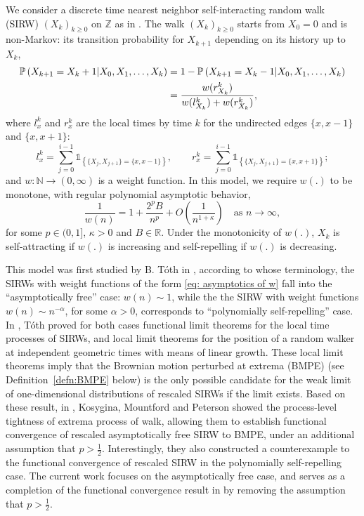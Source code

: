 \documentclass[twoside,12pt,a4paper]{article}
\numberwithin{equation}{section}
\newcommand\TBD{\textcolor{red}{TBD.}}
\begin{document}
	We consider a discrete time nearest neighbor self-interacting random walk (SIRW) $(X_k)_{k\geq 0}$ on $\mathbb{Z}$ as in \cite{T96,KMP22}. The walk $(X_k)_{k\geq 0}$ starts from $X_0 = 0$ and is non-Markov: its transition probability for $X_{k+1}$ depending on its history up to $X_k$, 
	\begin{align}
		\mathbb{P}\left( X_{k+1} =  X_k+1 \middle| X_0, X_1,\dots, X_k   \right) 
		&=1- \mathbb{P}\left( X_{k+1} =  X_k-1 \middle| X_0, X_1,\dots, X_k   \right)  
		\notag
		\\
		&=  \frac{  w(r_{X_k}^k)}{ w(l_{X_k}^k)  + w(r_{X_k}^k)   }
		, \label{dynamic}
	\end{align}
	where $l_x^k$ and $r_x^k$ are the local times by time $k$ for the undirected edges $\{x,x-1\}$ and $\{x,x+1\}$:
	\[ 
	l_x^k = \sum_{j=0}^{i-1} \mathbb{1}_{ \left\{  \{X_j, X_{j+1}\} =  \{x,x-1\} \right\} }, \qquad
	r_x^k = \sum_{j=0}^{i-1} \mathbb{1}_{ \left\{  \{X_j, X_{j+1}\} =  \{x,x+1\} \right\} }   
	;\]
	and $
		w: \mathbb{N} \to  (0, \infty )
	$ 
	is a weight function.
	In this model, we require $w(.)$ to be monotone, with regular polynomial asymptotic behavior,
	\begin{equation}\label{eq: asymptotics of w}
		\frac{1}{w(n)} = 1 + \frac{2^p B}{n^p} + O\left(\frac{1}{n^{1+\mathcal{\kappa}}}\right) \quad \mbox{as $n\to \infty$}, 	
	\end{equation} 
	for some $p \in (0,1]$, $\kappa>0$ and $B\in \mathbb{R}$. Under the monotonicity of $w(.)$, $X_k$ is self-attracting if $w(.)$ is increasing and self-repelling if $w(. )$ is decreasing.

	This model was first studied by B. T\'oth in \cite{T96}, according to whose terminology, the SIRWs with weight functions of the form \eqref{eq: asymptotics of w} fall into the ``asymptotically free'' case: $w(n)\sim 1$, while the the SIRW with weight functions $w(n)\sim n^{-\alpha}$, for some $\alpha >0$, corresponds to ``polynomially self-repelling'' case. In \cite{T96}, T\'oth proved for both cases functional limit theorems for the local time processes of SIRWs, 
	and local limit theorems for the position of a random walker at independent geometric times with means of linear growth. 
	These local limit theorems imply that the Brownian motion perturbed at extrema (BMPE) (see Definition~\ref{defn:BMPE} below) is the only possible candidate for the weak limit of one-dimensional distributions of rescaled SIRWs if the limit exists. 
	Based on these result, in \cite{KMP22}, Kosygina, Mountford and Peterson showed the process-level tightness of extrema process of walk, 
	allowing them to establish functional convergence of rescaled asymptotically free SIRW to BMPE, under an additional assumption that $p > \frac{1}{2}$. Interestingly, they also constructed a counterexample to the functional convergence of rescaled SIRW in the polynomially self-repelling case. The current work focuses on the asymptotically free case, and serves as a completion of the functional convergence result in \cite{KMP22} by removing the assumption that  $p > \frac{1}{2}$.
	
\end{document}
